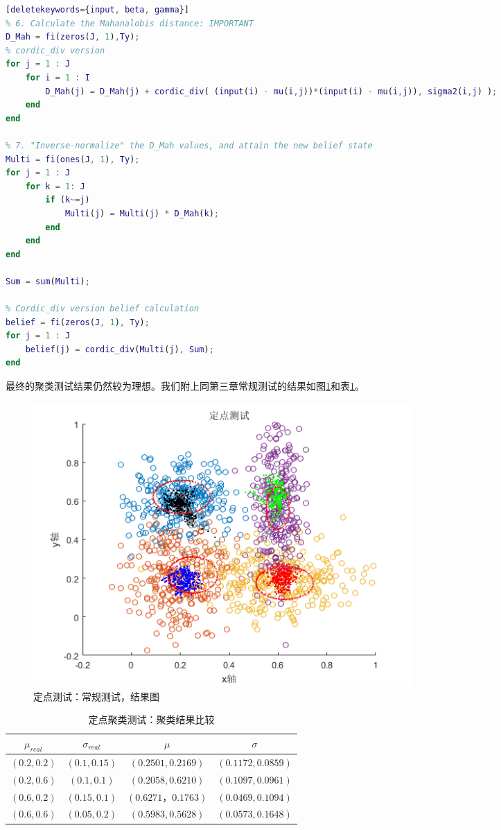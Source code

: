 \begin{spacing}{1}
\begin{lstlisting}[language=Matlab][deletekeywords={input, beta, gamma}]
% 6. Calculate the Mahanalobis distance: IMPORTANT
D_Mah = fi(zeros(J, 1),Ty);
% cordic_div version
for j = 1 : J
    for i = 1 : I
        D_Mah(j) = D_Mah(j) + cordic_div( (input(i) - mu(i,j))*(input(i) - mu(i,j)), sigma2(i,j) );
    end
end

% 7. "Inverse-normalize" the D_Mah values, and attain the new belief state
Multi = fi(ones(J, 1), Ty);
for j = 1 : J
    for k = 1: J
        if (k~=j)
            Multi(j) = Multi(j) * D_Mah(k);
        end
    end
end

Sum = sum(Multi);

% Cordic_div version belief calculation
belief = fi(zeros(J, 1), Ty); 
for j = 1 : J
    belief(j) = cordic_div(Multi(j), Sum);
end

\end{lstlisting}
\end{spacing}

最终的聚类测试结果仍然较为理想。我们附上同第三章常规测试的结果如图\ref{fig:fixedre}和表\ref{tab:clustestfix}。

\begin{figure}[htbp]
   \centering
   \includegraphics[width=0.7\textwidth]{FixedPointClustering.png} %
   \caption{定点测试：常规测试，结果图}
   \label{fig:fixedre}
\end{figure}

\begin{table}[htbp]
\centering
\begin{tabular}{c|c||c|c}
  \hline
  $\mu_{real}$   &  $\sigma_{real}$ &  $\mu$  &   $\sigma$\\
  \hline
  $(0.2,0.2)$    &  $(0.1,0.15)$   &  $(0.2501, 0.2169)$  & $(0.1172, 0.0859)$ \\
  $(0.2,0.6)$    &  $(0.1,0.1)$   &  $(0.2058, 0.6210)$  & $(0.1097, 0.0961)$ \\
  $(0.6,0.2)$    &  $(0.15,0.1)$   &  $(0.6271，0.1763)$  & $(0.0469, 0.1094)$ \\
  $(0.6,0.6)$    &  $(0.05,0.2)$   &  $(0.5983, 0.5628)$  & $(0.0573, 0.1648)$ \\
  \hline
\end{tabular}
\caption{定点聚类测试：聚类结果比较}
\label{tab:clustestfix}
\end{table}

